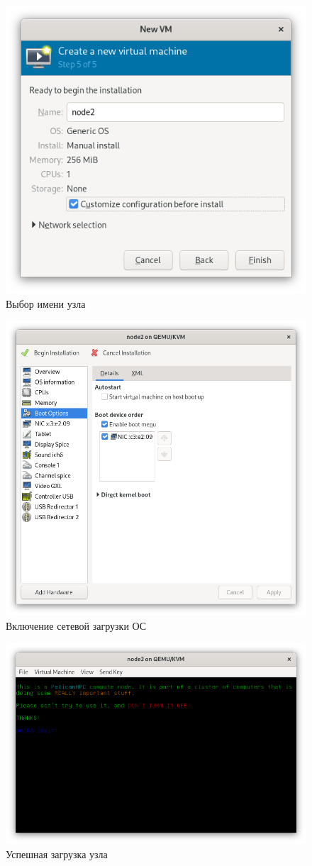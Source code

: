 \begin{figure}[H]
	\centering
	\includegraphics[width=0.5\linewidth]{2-05}
	\caption{Выбор имени узла}
	\label{nodes/05}
\end{figure}

\begin{figure}[H]
	\centering
	\includegraphics[width=0.7\linewidth]{2-06}
	\caption{Включение сетевой загрузки ОС}
	\label{nodes/06}
\end{figure}

\begin{figure}[H]
	\centering
	\includegraphics[width=0.7\linewidth]{2-07}
	\caption{Успешная загрузка узла}
	\label{nodes/07}
\end{figure}

